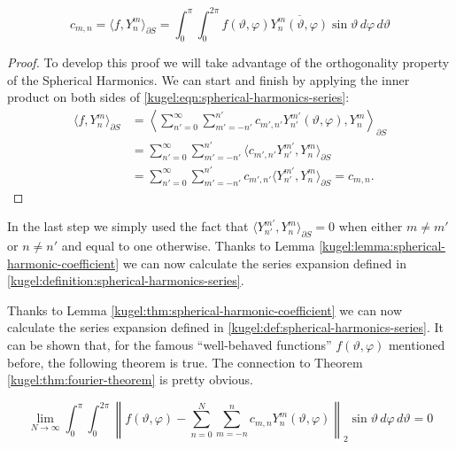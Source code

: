 \begin{lemma}
  \label{kugel:thm:spherical-harmonic-coefficient}
  \begin{equation*}
    c_{m,n} 
    = \langle f, Y^m_n \rangle_{\partial S}
    = \int_0^\pi \int_0^{2\pi}
      f(\vartheta,\varphi) \overline{Y^m_n(\vartheta,\varphi)}
      \sin\vartheta \,d\varphi\,d\vartheta
  \end{equation*}
\end{lemma}

\begin{proof}
  To develop this proof we will take advantage of the orthogonality property of
  the Spherical Harmonics. We can start and finish by applying the inner product
  on both sides of \eqref{kugel:eqn:spherical-harmonics-series}:
  \begin{align*}
    \langle f, Y^{m}_{n} \rangle_{\partial S}
    &= \left\langle \sum_{n'=0}^\infty \sum_{m' =-n'}^{n'}
      c_{m',n'} Y^{m'}_{n'}(\vartheta, \varphi), Y^{m}_{n}  \right\rangle_{\partial S}  \\
    &=  \sum_{n'=0}^\infty \sum_{m' =-n'}^{n'}
      \langle c_{m',n'} Y^{m'}_{n'}, Y^{m}_{n} \rangle_{\partial S} \\
      &= \sum_{n'=0}^\infty \sum_{m' =-n'}^{n'} c_{m',n'} \langle Y^{m'}_{n'}, Y^{m}_{n} \rangle_{\partial S} = c_{m,n}.
  \end{align*}
\end{proof}
In the last step we simply used the fact that $\langle Y^{m'}_{n'}, Y^{m}_{n} \rangle_{\partial S} = 0$ when either $m \neq m'$ or $n \neq n'$ and equal to one otherwise.
Thanks to Lemma \ref{kugel:lemma:spherical-harmonic-coefficient} we can now calculate the series expansion defined in \ref{kugel:definition:spherical-harmonics-series}.

Thanks to Lemma \ref{kugel:thm:spherical-harmonic-coefficient} we can now
calculate the series expansion defined in
\ref{kugel:def:spherical-harmonics-series}. It can be shown that, for the famous
``well-behaved functions'' $f(\vartheta, \varphi)$ mentioned before, the
following theorem is true.  The connection to Theorem
\ref{kugel:thm:fourier-theorem} is pretty obvious.

\begin{theorem}
  \label{fourier-theorem-spherical-surface}
  \begin{equation*}
    \lim_{N \to \infty}
    \int_0^\pi \int_0^{2\pi} \left\| f(\vartheta,\varphi) - \sum_{n=0}^N\sum_{m=-n}^n c_{m,n} Y^m_n(\vartheta,\varphi)
    \right\|_2 \sin\vartheta \,d\varphi\,d\vartheta  = 0
  \end{equation*}
\end{theorem}


